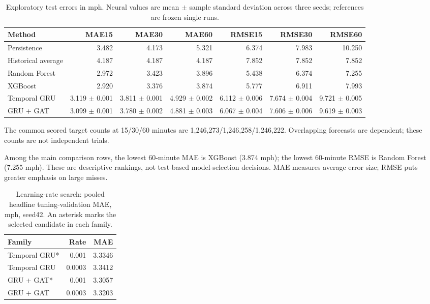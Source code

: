 \begin{table}[t]\centering\small
\caption{Exploratory test errors in mph. Neural values are mean $\pm$ sample standard deviation across three seeds; references are frozen single runs.}
\begin{tabular}{lrrrrrr}\toprule
Method & MAE15 & MAE30 & MAE60 & RMSE15 & RMSE30 & RMSE60\\\midrule
Persistence & 3.482 & 4.173 & 5.321 & 6.374 & 7.983 & 10.250\\
Historical average & 4.187 & 4.187 & 4.187 & 7.852 & 7.852 & 7.852\\
Random Forest & 2.972 & 3.423 & 3.896 & 5.438 & 6.374 & 7.255\\
XGBoost & 2.920 & 3.376 & 3.874 & 5.777 & 6.911 & 7.993\\
Temporal GRU & 3.119 $\pm$ 0.001 & 3.811 $\pm$ 0.001 & 4.929 $\pm$ 0.002 & 6.112 $\pm$ 0.006 & 7.674 $\pm$ 0.004 & 9.721 $\pm$ 0.005\\
GRU + GAT & 3.099 $\pm$ 0.001 & 3.780 $\pm$ 0.002 & 4.881 $\pm$ 0.003 & 6.067 $\pm$ 0.004 & 7.606 $\pm$ 0.006 & 9.619 $\pm$ 0.003\\
\bottomrule\end{tabular}
\end{table}

The common scored target counts at 15/30/60 minutes are 1,246,273/1,246,258/1,246,222. Overlapping forecasts are dependent; these counts are not independent trials.


Among the main comparison rows, the lowest 60-minute MAE is XGBoost (3.874 mph); the lowest 60-minute RMSE is Random Forest (7.255 mph). These are descriptive rankings, not test-based model-selection decisions. MAE measures average error size; RMSE puts greater emphasis on large misses.


\begin{table}[t]\centering\small
\caption{Learning-rate search: pooled headline tuning-validation MAE, mph, seed42. An asterisk marks the selected candidate in each family.}
\begin{tabular}{lrr}\toprule
Family & Rate & MAE\\\midrule
Temporal GRU* & 0.001 & 3.3346\\
Temporal GRU & 0.0003 & 3.3412\\
GRU + GAT* & 0.001 & 3.3057\\
GRU + GAT & 0.0003 & 3.3203\\
\bottomrule\end{tabular}
\end{table}

